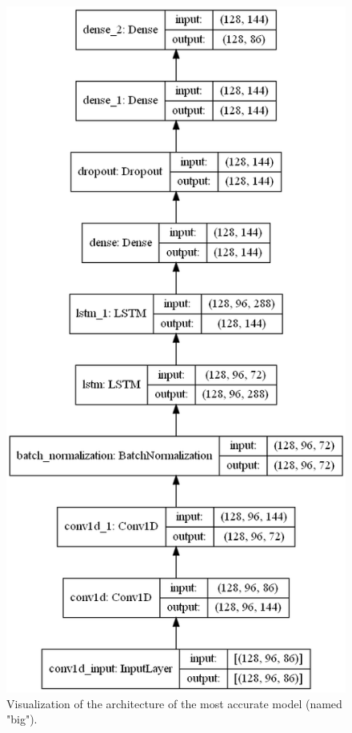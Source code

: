 \documentclass[11pt, twocolumn]{article}
\begin{document}
\begin{figure}
    \centering
    \includegraphics[width=\linewidth]{images/big.png}
    \caption{Visualization of the architecture of the most accurate model (named "big").}
    \label{fig:arch}
\end{figure}
\end{document}
